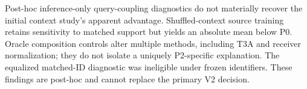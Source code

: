 Post-hoc inference-only query-coupling diagnostics do not materially recover the initial context study's apparent advantage. Shuffled-context source training retains sensitivity to matched support but yields an absolute mean below P0. Oracle composition controls alter multiple methods, including T3A and receiver normalization; they do not isolate a uniquely P2-specific explanation. The equalized matched-ID diagnostic was ineligible under frozen identifiers. These findings are post-hoc and cannot replace the primary V2 decision.
